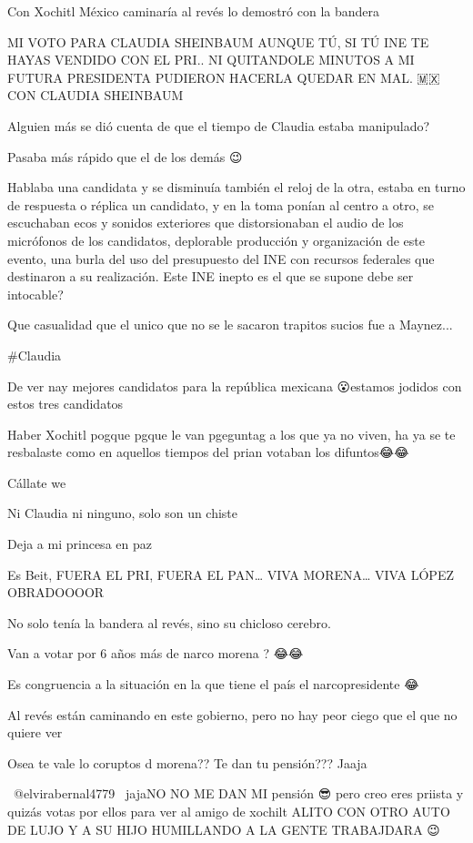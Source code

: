 Con Xochitl México caminaría al revés lo demostró con la bandera

MI VOTO PARA CLAUDIA SHEINBAUM AUNQUE TÚ, SI TÚ INE TE HAYAS VENDIDO CON EL PRI.. NI QUITANDOLE MINUTOS A MI FUTURA PRESIDENTA PUDIERON HACERLA QUEDAR EN MAL. 🇲🇽 CON CLAUDIA SHEINBAUM

Alguien más se dió cuenta de que el tiempo de Claudia estaba manipulado? 

Pasaba más rápido que el de los demás 😉

Hablaba una candidata y se disminuía también el reloj de la otra, estaba en turno de respuesta o réplica un candidato, y en la toma ponían al centro a otro, se escuchaban ecos y sonidos exteriores que distorsionaban el audio de los micrófonos de los candidatos, deplorable producción y organización de este evento, una burla del uso del presupuesto del INE con recursos federales que destinaron a su realización. Este INE inepto es el que se supone debe ser intocable?

Que casualidad que el unico que no se le sacaron trapitos sucios fue a Maynez...

#Claudia

De ver nay mejores candidatos para la república mexicana 😮estamos jodidos con estos tres candidatos

Haber Xochitl pogque pgque le van pgeguntag a los que ya no viven,   ha ya se te resbalaste como en aquellos tiempos del prian votaban los difuntos😂😂

Cállate we

Ni Claudia ni ninguno, solo son un chiste

Deja a mi princesa en paz

Es Beit, FUERA EL PRI, FUERA EL PAN… VIVA MORENA… VIVA LÓPEZ OBRADOOOOR

No solo tenía la bandera al revés, sino su chicloso cerebro.

Van a votar por 6 años más de narco morena ? 😂😂

Es congruencia a la situación en la que tiene el país el narcopresidente 😂

Al revés están caminando en este gobierno, pero no hay peor ciego que el que no quiere ver

Osea te vale  lo coruptos   d morena?? Te dan tu pensión??? Jaaja

 @elvirabernal4779  jajaNO NO ME DAN MI pensión 😎 pero creo eres priista y quizás votas por ellos para ver al amigo de xochilt ALITO CON OTRO AUTO DE LUJO Y A  SU HIJO HUMILLANDO A LA GENTE TRABAJDARA 😉

